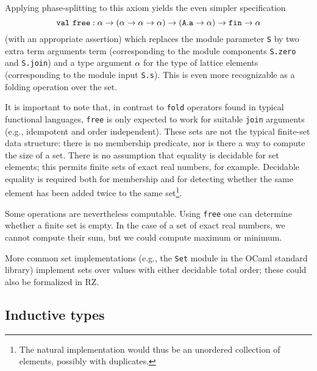 Applying phase-splitting to this axiom yields the even simpler
specification
\[
\mathtt{val}\ \mathtt{free} : \alpha \to (\alpha \to \alpha \to \alpha) \to (\mathtt{A.a}\to\alpha) \to \mathtt{fin} \to \alpha	
\]
(with an appropriate assertion)
which replaces the module parameter \texttt{S} by two extra term arguments term (corresponding to the module components \texttt{S.zero} and \texttt{S.join}) 
and a type argument $\alpha$ for the type of lattice elements (corresponding to the module input \texttt{S.s}).  This is even
more recognizable as a folding operation over the set.


It is important to note that, in contrast to \texttt{fold} operators found in typical functional
languages, \texttt{free} is only expected to work for suitable \texttt{join} arguments (e.g., idempotent and order independent).  These
sets are not the typical finite-set data structure: there is no membership predicate, nor
is there a way to compute the size of a set.  There is no
assumption that equality is decidable for set elements; this permits
finite sets of  exact real numbers, for example.  Decidable equality
is required both for membership and for detecting
whether the same element has been added twice to the same set\footnote{The natural implementation would thus
be an unordered collection of elements, possibly with duplicates.}.

Some operations are nevertheless computable.  Using \texttt{free} one
can determine whether a finite set is empty.  In the case of a set of exact
real numbers, we cannot compute their sum, but we could compute maximum or minimum.

More common set implementations (e.g., the \texttt{Set} module in the OCaml standard library)
implement sets over values with either decidable total order; these could also be
formalized in RZ.
\fi %

\subsection{Inductive types}
\label{sec:inductive-types}

